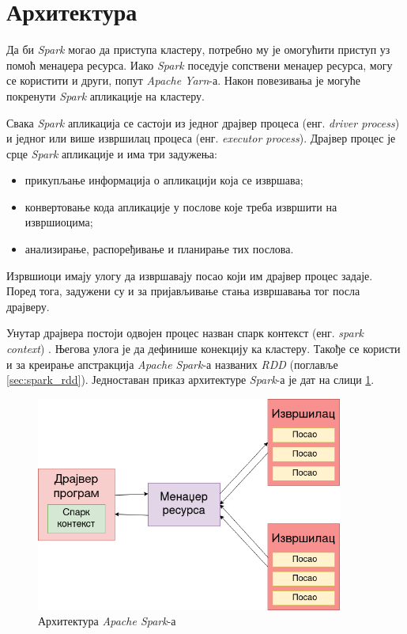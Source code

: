 \documentclass[12pt,oneside]{memoir}
\begin{document}
\section{Архитектура}
\label{sec:spark_arx}

Да би \textit{Spark} могао да приступа кластеру, потребно му је омогућити приступ уз помоћ менаџера ресурса. Иако \textit{Spark} поседује сопствени менаџер ресурса, могу се користити и други, попут \textit{Apache Yarn}-а. Након повезивања је могуће покренути \textit{Spark} апликације на кластеру. 

Свака \textit{Spark} апликација се састоји из једног драјвер процеса (енг. \textit{driver process}) и једног или више извршилац процеса (енг. \textit{executor process}). Драјвер процес је срце \textit{Spark} апликације и има три задужења:

\begin{itemize}
	\item прикупљање информација о апликацији која се извршава;	
	\item конвертовање кода апликације у послове које треба извршити на извршиоцима;
	\item анализирање, распоређивање и планирање тих послова.
\end{itemize}

Изрвшиоци имају улогу да извршавају посао који им драјвер процес задаје. Поред тога, задужени су и за пријављивање стања извршавања тог посла драјверу. 

Унутар драјвера постоји одвојен процес назван спарк контекст (енг. \textit{spark context}) \cite{spark_guide}. Његова улога је да дефинише конекцију ка кластеру. Такође се користи и за креирање апстракција \textit{Apache Spark}-а названих \textit{RDD} (поглавље \ref{sec:spark_rdd}). Једноставан приказ архитектуре \textit{Spark}-а је дат на слици \ref{fig:spark_arhtt}.

\begin{figure}[!ht]
  \centering
  \includegraphics[width=0.90\textwidth]{pictures/spark_arch.png}
  \caption{Архитектура \textit{Apache Spark}-а}
  \label{fig:spark_arhtt}
\end{figure}
\end{document}
